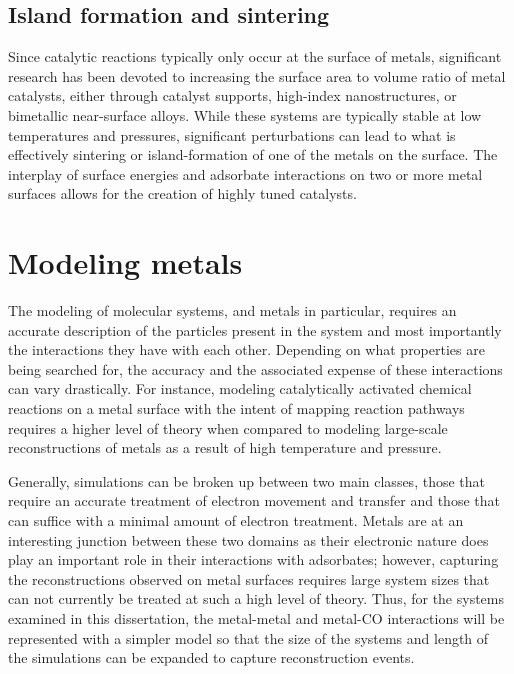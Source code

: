 \subsection{Island formation and sintering}
Since catalytic reactions typically only occur at the surface of metals,
significant research has been devoted to increasing the surface area to volume
ratio of metal catalysts, either through catalyst supports, high-index
nanostructures, or bimetallic near-surface alloys. While these systems are
typically stable at low temperatures and pressures, significant perturbations
can lead to what is effectively sintering or island-formation of one of the
metals on the surface.  The interplay of surface energies and adsorbate
interactions on two or more metal surfaces allows for the creation of
highly tuned catalysts.

\section{Modeling metals}
The modeling of molecular systems, and metals in particular, requires an
accurate description of the particles present in the system and most
importantly the interactions they have with each other. Depending on what
properties are being searched for, the accuracy and the associated expense of
these interactions can vary drastically. For instance, modeling catalytically
activated chemical reactions on a metal surface with the intent of mapping
reaction pathways requires a higher level of theory when compared to modeling
large-scale reconstructions of metals as a result of high temperature and
pressure.

Generally, simulations can be broken up between two main classes, those that
require an accurate treatment of electron movement and transfer and those that
can suffice with a minimal amount of electron treatment.  Metals are at an
interesting junction between these two domains as their electronic nature does
play an important role in their interactions with adsorbates; however,
capturing the reconstructions observed on metal surfaces requires large system
sizes that can not currently be treated at such a high level of theory. Thus,
for the systems examined in this dissertation, the metal-metal and metal-CO
interactions will be represented with a simpler model so that the size of the
systems and length of the simulations can be expanded to capture reconstruction
events.

